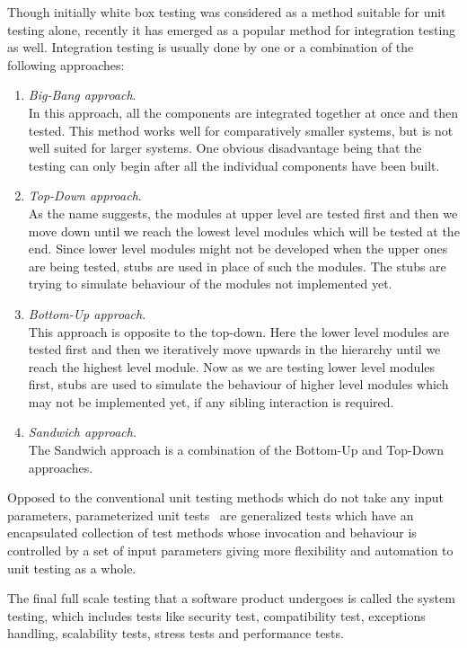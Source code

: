 Though initially white box testing was considered as a method suitable for unit testing alone, recently it has emerged as a popular method for integration testing as well. Integration testing is usually done by one or a combination of the following approaches: 
\begin{enumerate}[\IEEEsetlabelwidth{Z}]
\item \textit{Big-Bang approach}.\\In this approach, all the components are integrated together at once and then tested. This method works well for comparatively smaller systems, but is not well suited for larger systems. One obvious disadvantage being that the testing can only begin after all the individual components have been built.
\item \textit{Top-Down approach}.\\As the name suggests, the modules at upper level are tested first and then we move down until we reach the lowest level modules which will be tested at the end. Since lower level modules might not be developed when the upper ones are being tested, stubs are used in place of such the modules. The stubs are trying to simulate behaviour of the modules not implemented yet.
\item \textit{Bottom-Up approach}.\\This approach is opposite to the top-down. Here the lower level modules are tested first and then we iteratively move upwards in the hierarchy until we reach the highest level module. Now as we are testing lower level modules first, stubs are used to simulate the behaviour of higher level modules which may not be implemented yet, if any sibling interaction is required.
\item \textit{Sandwich approach}.\\ The Sandwich approach is a combination of the Bottom-Up and Top-Down approaches.
\end{enumerate}

Opposed to the conventional unit testing methods which do not take any input parameters, parameterized unit tests~\cite{tillmann2010parameterized} are generalized tests which have an encapsulated collection of test methods whose invocation and behaviour is controlled by a set of input parameters giving more flexibility and automation to unit testing as a whole.

The final full scale testing that a software product undergoes is called the system testing, which includes tests like security test, compatibility test, exceptions handling, scalability tests, stress tests and performance tests.

